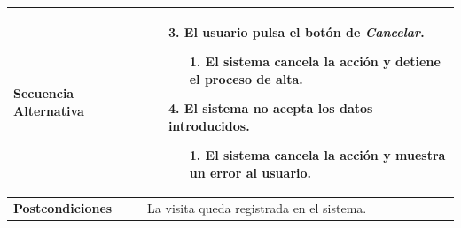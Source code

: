 \begin{longtable}{| p{4cm} | p{10cm} |}
\\
\hline
\textbf{Secuencia Alternativa} &\mbox{}\par\vspace{-\baselineskip}
\begin{enumerate}[leftmargin=0.9cm, topsep=0.1cm]
\item[3.] El usuario pulsa el botón de \textit{Cancelar}.
	\begin{itemize}
	\item[1.] El sistema cancela la acción y detiene el proceso de alta.
	\end{itemize}
\item[4.] El sistema no acepta los datos introducidos.
	\begin{itemize}
	\item[1.] El sistema cancela la acción y muestra un error al usuario.
	\end{itemize}
\end{enumerate}
\\

\hline
\textbf{Postcondiciones} & 
La visita queda registrada en el sistema.\\
\hline
\end{longtable}



\newpage
